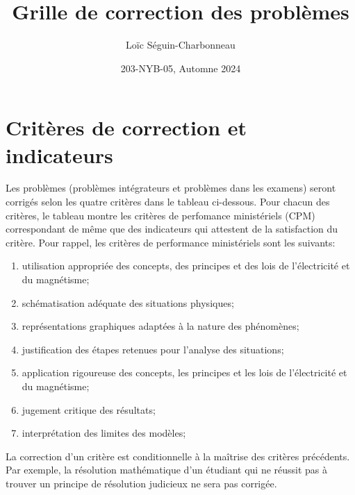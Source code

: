 \documentclass[nofonts]{tufte-handout}
\title{Grille de correction des problèmes}
\author{Loïc Séguin-Charbonneau}
\date{203-NYB-05, Automne 2024}
\begin{document}
\maketitle

\section{Critères de correction et indicateurs}

\begin{fullwidth}
Les problèmes (problèmes intégrateurs et problèmes dans les examens) seront
corrigés selon les quatre critères dans le tableau ci-dessous. Pour chacun des
  critères, le tableau montre les critères de perfomance ministériels (CPM)
correspondant de même que des indicateurs qui attestent de la satisfaction du
critère.
Pour rappel, les critères de performance ministériels sont les suivants:
\begin{enumerate}[label=\alph*.]
  \item utilisation appropriée des concepts, des principes et des lois de l’électricité et du magnétisme;
  \item schématisation adéquate des situations physiques;
  \item représentations graphiques adaptées à la nature des phénomènes;
  \item justification des étapes retenues pour l’analyse des situations;
  \item application rigoureuse des concepts, les principes et les lois de l’électricité et du magnétisme;
  \item jugement critique des résultats;
  \item interprétation des limites des modèles;
\end{enumerate}

\vspace{\baselineskip}
La correction d'un critère est conditionnelle à la maîtrise des critères
précédents. Par exemple, la résolution mathématique d'un étudiant qui ne
réussit pas à trouver un principe de résolution judicieux ne sera pas
corrigée.


\vspace{\baselineskip}


\end{fullwidth}
\end{document}
